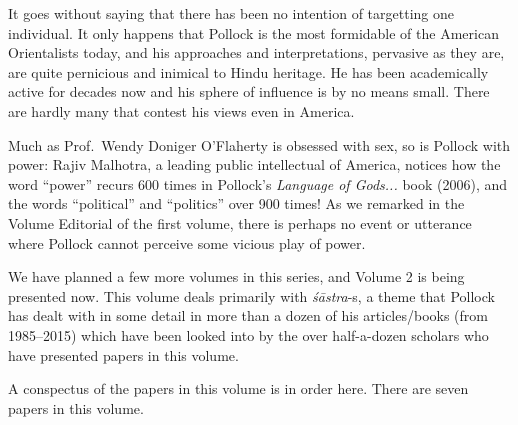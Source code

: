 It goes without saying that there has been no intention of targetting one individual. It only happens that Pollock is the most formidable of the American Orientalists today, and his approaches and interpretations, pervasive as they are, are quite pernicious and inimical to Hindu heritage. He has been academically active for decades now and his sphere of influence is by no means small. There are hardly many that contest his views even in America. 
\eject

Much as Prof.~Wendy Doniger O’Flaherty is obsessed with sex, so is Pollock with power: Rajiv Malhotra, a leading public intellectual of America, notices how the word “power” recurs 600 times in Pollock’s {\sl Language of Gods...} book (2006), and the words “political” and “politics” over 900 times! As we remarked in the Volume Editorial of the first volume, there is perhaps no event or utterance where Pollock cannot perceive some vicious play of power.

We have planned a few more volumes in this series, and Volume 2 is being presented now. This volume deals primarily with {\sl śāstra}-s, a theme that Pollock has dealt with in some detail in more than a dozen of his articles/books (from 1985--2015) which have been looked into by the over half-a-dozen scholars who have presented papers in this volume.
\vskip 6pt

A conspectus of the papers in this volume is in order here. There are seven papers in this volume.

